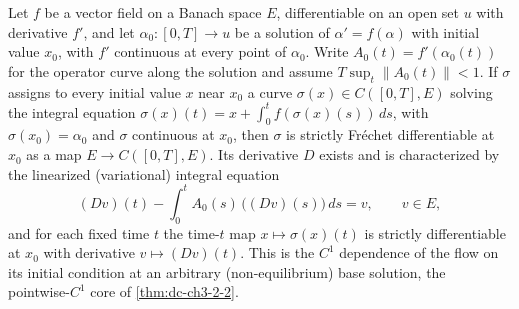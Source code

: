 \begin{lemma}
  \label{lem:dc-ch3-2-2-c1dep}


  Let $f$ be a vector field on a Banach space $E$, differentiable on an open
  set $u$ with derivative $f'$, and let $\alpha_0 : [0,T] \to u$ be a solution
  of $\alpha' = f(\alpha)$ with initial value $x_0$, with $f'$ continuous at
  every point of $\alpha_0$. Write $A_0(t) = f'(\alpha_0(t))$ for the operator
  curve along the solution and assume $T \sup_t \|A_0(t)\| < 1$. If $\sigma$
  assigns to every initial value $x$ near $x_0$ a curve
  $\sigma(x) \in C([0,T], E)$ solving the integral equation
  $\sigma(x)(t) = x + \int_0^t f(\sigma(x)(s))\,ds$, with
  $\sigma(x_0) = \alpha_0$ and $\sigma$ continuous at $x_0$, then $\sigma$ is
  strictly Fr\'echet differentiable at $x_0$ as a map $E \to C([0,T], E)$. Its
  derivative $D$ exists and is characterized by the linearized (variational)
  integral equation
  $$
  (Dv)(t) - \int_0^t A_0(s)\,\big((Dv)(s)\big)\,ds = v, \qquad v \in E,
  $$
  and for each fixed time $t$ the time-$t$ map $x \mapsto \sigma(x)(t)$ is
  strictly differentiable at $x_0$ with derivative $v \mapsto (Dv)(t)$. This is
  the $C^1$ dependence of the flow on its initial condition at an arbitrary
  (non-equilibrium) base solution, the pointwise-$C^1$ core of
  \cref{thm:dc-ch3-2-2}.
\end{lemma}
